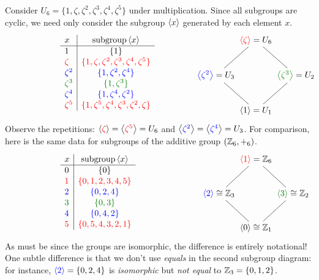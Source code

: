 \begin{example}{}{}
	Consider $U_6=\{1,\zeta,\zeta^2,\zeta^3,\zeta^4,\zeta^5\}$ under multiplication. Since all subgroups are cyclic, we need only consider the subgroup $\left\langle x\right\rangle$ generated by each element $x$.
	\[
		\makebox[230pt][l]{%
			$\def\arraystretch{1.05}
			\begin{array}[t]{l|c}
				x & \text{subgroup}\ip x\\ \hline
				1 & \{1 \} \\
				\textcolor{red}{\zeta} & \textcolor{red}{\{1,\zeta,\zeta^2,\zeta^3,\zeta^4,\zeta^5\}}\\
				\textcolor{blue}{\zeta^2} & \textcolor{blue}{\{1,\zeta^2,\zeta^4\}}\\
				\textcolor{Green}{\zeta^3} & \textcolor{Green}{\{1,\zeta^3\}}\\
				\textcolor{blue}{\zeta^4} & \textcolor{blue}{\{1,\zeta^4,\zeta^2\}}\\
				\textcolor{red}{\zeta^5} & \textcolor{red}{\{1,\zeta^5,\zeta^4,\zeta^3,\zeta^2,\zeta\}}
			\end{array}$
		}
		\makebox[0pt][c]{%
			$\xymatrix @C0pt @R24pt{%
				& \textcolor{red}{\ip{\zeta}}=U_6 \ar@{-}[dl] \ar@{-}[dr] & \\
				\textcolor{blue}{\ip{\zeta^2}}=U_3 \ar@{-}[dr] & & \textcolor{Green}{\ip{\zeta^3}}=U_2 \ar@{-}[dl] \\
				& \ip{1}=U_1 &
			}$
		}
	\]
	Observe the repetitions: $\left\langle \textcolor{red}{\zeta}\right\rangle=\left\langle \textcolor{red}{\zeta^5}\right\rangle=U_6$ and $\left\langle \textcolor{blue}{\zeta^2}\right\rangle=\left\langle \textcolor{blue}{\zeta^4}\right\rangle=U_3$.
	\smallbreak
	For comparison, here is the same data for subgroups of the additive group $(\mathbb{Z}_6,+_6)$.
	\[
		\makebox[230pt][l]{%
			$\def\arraystretch{1.05}
			\begin{array}[t]{l|c}
				x & \text{subgroup}\ip x\\ \hline
				0 & \{0\} \\
				\textcolor{red}{1} & \textcolor{red}{\{0,1,2,3,4,5\}}\\
				\textcolor{blue}{2} & \textcolor{blue}{\{0,2,4\}}\\
				\textcolor{Green}{3} & \textcolor{Green}{\{0,3\}}\\
				\textcolor{blue}{4} & \textcolor{blue}{\{0,4,2\}}\\
				\textcolor{red}{5} & \textcolor{red}{\{0,5,4,3,2,1\}}
			\end{array}$
		}
	\makebox[0pt][c]{%
		$\xymatrix @C0pt @R24pt{%
			& \textcolor{red}{\ip{1}}=\Z_6 \ar@{-}[dl] \ar@{-}[dr] & \\
			\textcolor{blue}{\ip{2}}\cong\Z_3 \ar@{-}[dr] & & \textcolor{Green}{\ip{3}}\cong\Z_2 \ar@{-}[dl] \\
			& \ip{0}\cong\Z_1 &
			}$
		}
	\]
	As must be since the groups are isomorphic, the difference is entirely notational! One subtle difference is that we don't use \emph{equals} in the second subgroup diagram: for instance, $\textcolor{blue}{\left\langle 2\right\rangle}=\{0,2,4\}$ is \emph{isomorphic} but \emph{not equal} to $\mathbb{Z}_3=\{0,1,2\}$.
\end{example}


